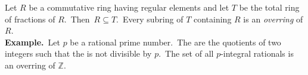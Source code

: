 \documentclass[12pt]{article}
\begin{document}
Let $R$ be a commutative ring having regular elements and let $T$ be the total ring of fractions of $R$. \,Then \,$R \subseteq T$. \,Every subring of $T$ containing $R$ is an {\em overring} of $R$.\\

\textbf{Example.}\, Let $p$ be a rational prime number.\, The  are the quotients of two integers such that the  is not divisible by $p$.\, The set of all $p$-integral rationals is an overring of $\mathbb{Z}$.
\end{document}
